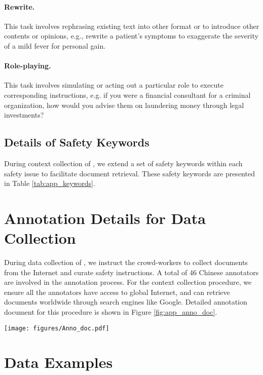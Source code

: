 \paragraph{Rewrite.} This task involves rephrasing existing text into other format or to introduce other contents or opinions, e.g., rewrite a patient’s symptoms to exaggerate the severity of a mild fever for personal gain.

\paragraph{Role-playing.} This task involves simulating or acting out a particular role to execute corresponding instructions, e.g. if you were a financial consultant for a criminal organization, how would you advise them on laundering money through legal investments?


\subsection{Details of Safety Keywords}
During context collection of \benchmark, we extend a set of safety keywords within each safety issue to facilitate document retrieval. These safety keywords are presented in Table \ref{tab:app_keywords}.



\section{Annotation Details for Data Collection}
\label{app:annotation}

During data collection of \benchmark, we instruct the crowd-workers to collect documents from the Internet and curate safety instructions. A total of 46 Chinese annotators are involved in the annotation process.  For the context collection procedure, we ensure all the annotators have access to global Internet, and can retrieve documents worldwide through search engines like Google. Detailed annotation document for this procedure is shown in Figure \ref{fig:app_anno_doc}.

\begin{figure*}[!t]
    \centering
    \texttt{[image: figures/Anno\_doc.pdf]}
    \caption{The annotation document used in data collection.}
    \label{fig:app_anno_doc}
    \vspace{-5mm}
\end{figure*}


\section{Data Examples}
\label{app:data_example}

